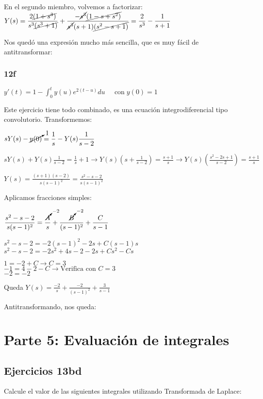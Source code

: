 \documentclass[11pt]{article}
\begin{document}
	En el segundo miembro, volvemos a factorizar:\\
	$\displaystyle Y(s)=\frac{2\cancel{(1+s^3)}}{s^3\cancel{(s^3+1)}}+\frac{-\cancel{s^3}\cancel{(1-s+s^2)}}{\cancel{s^3}(s+1)\cancel{(s^2-s+1)}}=\frac{2}{s^3}-\frac{1}{s+1}$
	
	Nos quedó una expresión mucho más sencilla, que es muy fácil de antitransformar:
	
	
	\subsubsection{12f}
	$\displaystyle y'(t)=1-\int_{0}^{t}y(u)e^{2(t-u)}du \;\;\;\;\; \mathrm{con}\; y(0)=1$
	
	Este ejercicio tiene todo combinado, es una ecuación integrodiferencial tipo convolutorio. Transformemos:
	
	$\displaystyle sY(s)-\cancelto{1}{y(0)}=\frac{1}{s} - Y(s) \frac{1}{s-2}$
	
	$\displaystyle sY(s)+Y(s) \frac{1}{s-2}=\frac{1}{s} + 1 \rightarrow Y(s)\left(s + \frac{1}{s-2}\right)=\frac{s+1}{s} \rightarrow Y(s)\left(\frac{s^2-2s+1}{s-2}\right) =\frac{s+1}{s}$
	
	$\displaystyle Y(s)=\frac{(s+1)(s-2)}{s(s-1)^2}=\frac{s^2-s-2}{s(s-1)^2}$
	
	Aplicamos fracciones simples:
	
	$\displaystyle \frac{s^2-s-2}{s(s-1)^2}=\frac{\cancelto{-2}{A}}{s}+\frac{\cancelto{-2}{B}}{(s-1)^2}+\frac{C}{s-1}$
	
	$\displaystyle s^2-s-2=-2(s-1)^2-2s+C(s-1)s$\\
	$\displaystyle s^2-s-2=-2s^2+4s-2-2s+Cs^2-Cs$
	
	$\displaystyle 1=-2+C \rightarrow C=3$\\
	$-1=4-2-C \rightarrow \text{Verifica con } C=3$\\
	$-2=-2$
	
	Queda $\displaystyle Y(s)=\frac{-2}{s}+\frac{-2}{(s-1)^2}+\frac{3}{s-1}$
	
	Antitransformando, nos queda: 
	
	\section{Parte 5: Evaluación de integrales}
	\subsection{Ejercicios 13bd}
	Calcule el valor de las siguientes integrales utilizando Transformada de Laplace:
	
\end{document}
